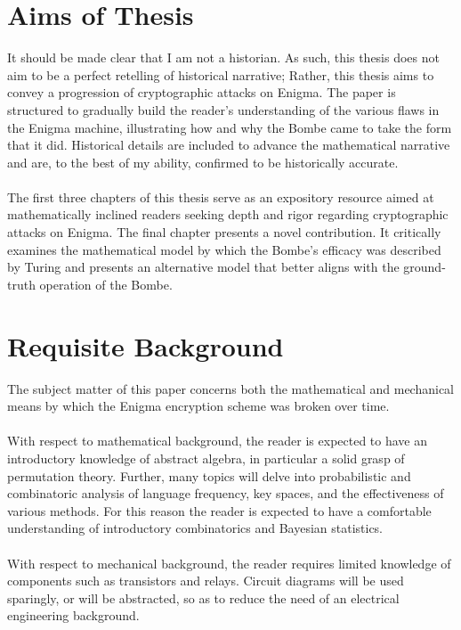 \documentclass{dcthesis}
\theoremstyle{definition}
\theoremstyle{remark}
\begin{document}
\chapter*{Aims of Thesis}
It should be made clear that I am not a historian. As such, this
thesis does not aim to be a perfect retelling of historical
narrative; Rather, this thesis aims to convey a
progression of cryptographic attacks on Enigma. The paper is
structured to gradually build the reader's
understanding of the various flaws in the Enigma machine,
illustrating how and why the Bombe came to take the form that it did.
Historical details are included to advance the mathematical narrative
and are, to the best of my ability, confirmed to be historically accurate.
\\\\The first three chapters of this thesis serve as an expository
resource aimed at mathematically inclined readers seeking depth and
rigor regarding cryptographic attacks on Enigma. The final chapter
presents a novel contribution. It critically examines the
mathematical model by which the Bombe's efficacy was described by
Turing and presents an alternative model that better aligns with the
ground-truth operation of the Bombe.

\chapter*{Requisite Background}
The subject matter of this paper concerns both the mathematical and
mechanical means by which the Enigma encryption scheme was broken over time.
\\\\With respect to mathematical background, the reader is expected
to have an introductory knowledge of abstract algebra, in particular
a solid grasp of permutation theory. Further, many topics will delve
into probabilistic and combinatoric analysis of language frequency,
key spaces, and the effectiveness of various methods. For this reason
the reader is expected to have a comfortable understanding of
introductory combinatorics and Bayesian statistics.
\\\\With respect to mechanical background, the reader requires
limited knowledge of components such as transistors and relays.
Circuit diagrams will be used sparingly, or will be abstracted, so as
to reduce the need of an electrical engineering background.
\end{document}
